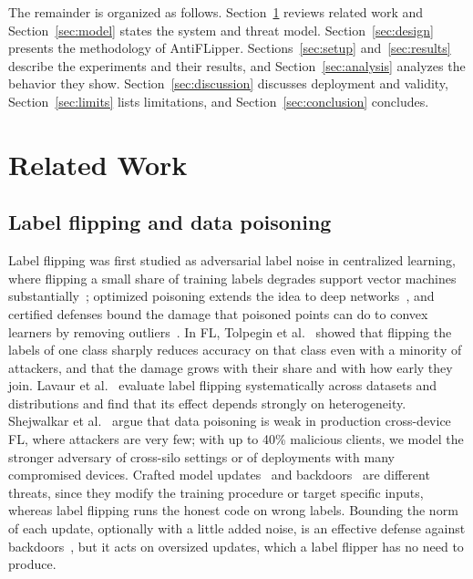 \documentclass[journal]{IEEEtran}
\begin{document}
The remainder is organized as follows. Section~\ref{sec:related} reviews related work and Section~\ref{sec:model} states the system and threat model. Section~\ref{sec:design} presents the methodology of AntiFLipper. Sections~\ref{sec:setup} and~\ref{sec:results} describe the experiments and their results, and Section~\ref{sec:analysis} analyzes the behavior they show. Section~\ref{sec:discussion} discusses deployment and validity, Section~\ref{sec:limits} lists limitations, and Section~\ref{sec:conclusion} concludes.

\section{Related Work}
\label{sec:related}
\subsection{Label flipping and data poisoning}
Label flipping was first studied as adversarial label noise in centralized learning, where flipping a small share of training labels degrades support vector machines substantially~\cite{biggio2011support}; optimized poisoning extends the idea to deep networks~\cite{munoz2017towards}, and certified defenses bound the damage that poisoned points can do to convex learners by removing outliers~\cite{steinhardt2017certified}. In FL, Tolpegin et al.~\cite{tolpegin2020data} showed that flipping the labels of one class sharply reduces accuracy on that class even with a minority of attackers, and that the damage grows with their share and with how early they join. Lavaur et al.~\cite{lavaur2024systematic} evaluate label flipping systematically across datasets and distributions and find that its effect depends strongly on heterogeneity. Shejwalkar et al.~\cite{shejwalkar2022backdrawingboard} argue that data poisoning is weak in production cross-device FL, where attackers are very few; with up to 40\% malicious clients, we model the stronger adversary of cross-silo settings or of deployments with many compromised devices. Crafted model updates~\cite{bhagoji2019analyzing,fang2020local,shejwalkar2021manipulating} and backdoors~\cite{bagdasaryan2020backdoor,wang2020attack} are different threats, since they modify the training procedure or target specific inputs, whereas label flipping runs the honest code on wrong labels. Bounding the norm of each update, optionally with a little added noise, is an effective defense against backdoors~\cite{sun2019really}, but it acts on oversized updates, which a label flipper has no need to produce.
\end{document}
